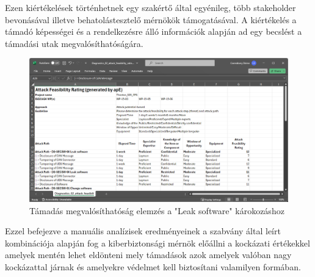 Ezen kiértékelések történhetnek egy szakértő által egyénileg, több stakeholder bevonásával illetve behatolástesztelő mérnökök támogatásával. A kiértékelés a támadó képességei és a rendelkezésre álló információk alapján ad egy becslést a támadási utak megvalósíthatóságára.

\begin{figure}[!ht]
	\centering
	\includegraphics[width=120mm, keepaspectratio]{figures/ff_attfeas.png}
	\caption{Támadás megvalósíthatóság elemzés a "Leak software" károkozáshoz} 
	\label{fig:ff_attfeas}
\end{figure}

Ezzel befejezve a manuális analízisek eredményeinek a szabvány által leírt kombinációja alapján fog a kiberbiztonsági mérnök előállni a kockázati értékekkel amelyek mentén lehet eldönteni mely támadások azok amelyek valóban nagy kockázattal járnak és amelyekre védelmet kell biztosítani valamilyen formában.